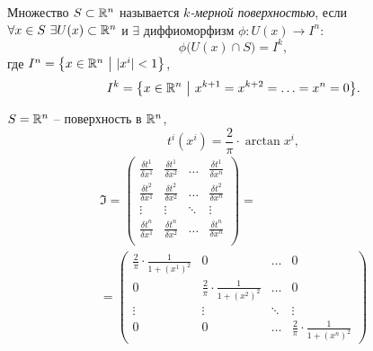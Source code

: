 

\begin{definition}
    Множество $ S \subset \mathbb{R}^n $ называется \emph{$ k $-мерной поверхностью}, если $ \forall x \in S \ \exists U(x)\subset\R^n $ и $ \exists $ диффиоморфизм $ \phi: U(x)\rightarrow I^n $:
    \[
        \phi\big(U(x)\cap S\big) = I^k,
    \] где $ I^n = \big\{x \in \mathbb{R}^n \ \big| \ |x^i| < 1 \big\} $,
    \[
        I^k = \big\{x \in \mathbb{R}^n \ \big| \ x^{k+1} = x^{k+2} = \ldots = x^n = 0\big\}.
    \]
\end{definition}

\newpage

\begin{example}
    $S = \mathbb{R}^n$ -- поверхность в $\mathbb{R}^n$,
    \[
        t^i(x^i) = \frac{2}{\pi}\cdot \arctan x^i,
    \]
    \begin{multline*}
        \mathfrak{I} = \left(\begin{matrix}
                \frac{\delta t^1}{\delta x^1} & \frac{\delta t^1}{\delta x^2} & \ldots & \frac{\delta t^1}{\delta x^n} \\
                \frac{\delta t^2}{\delta x^1} & \frac{\delta t^2}{\delta x^2} & \ldots & \frac{\delta t^2}{\delta x^n} \\
                \vdots                        & \vdots                        & \ddots & \vdots                        \\
                \frac{\delta t^n}{\delta x^1} & \frac{\delta t^n}{\delta x^2} & \ldots & \frac{\delta t^n}{\delta x^n} \\
            \end{matrix}\right) = \\
        = \left(\begin{matrix}
                \frac{2}{\pi} \cdot \frac{1}{1 + (x^1)^2} & 0                                         & \ldots & 0                                         \\
                0                                         & \frac{2}{\pi} \cdot \frac{1}{1 + (x^2)^2} & \ldots & 0                                         \\
                \vdots                                    & \vdots                                    & \ddots & \vdots                                    \\
                0                                         & 0                                         & \ldots & \frac{2}{\pi} \cdot \frac{1}{1 + (x^n)^2}
            \end{matrix}\right)
    \end{multline*}
\end{example}

